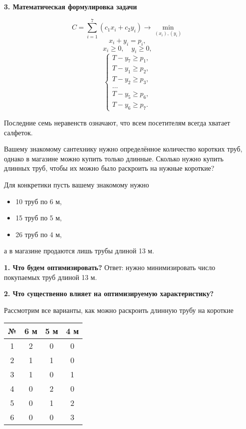 \textbf{3. Математическая формулировка задачи}

\[
	C = \sum_{i=1}^7 (c_1 x_i + c_2 y_i) \to \min_{(x_i), (y_i)}
\]
\[
	x_i + y_i = p_i,
\]
\[
	x_i \ge 0, \quad y_i \ge 0,
\]
\[
	\begin{cases}
		T - y_7 \ge p_1, \\
		T - y_1 \ge p_2, \\
		T - y_2 \ge p_3, \\
		\dots \\
		T - y_5 \ge p_6, \\
		T - y_6 \ge p_7.
	\end{cases}
\]

Последние семь неравенств означают, что всем посетителям всегда хватает салфеток.

\problem[раскроя]

Вашему знакомому сантехнику нужно определённое количество коротких труб, однако в магазине можно купить только длинные. Сколько нужно купить длинных труб, чтобы их можно было раскроить на нужные короткие?

Для конкретики пусть вашему знакомому нужно
\begin{itemize}[nosep]
	\item 10 труб по 6 м,
	
	\item 15 труб по 5 м,
	
	\item 26 труб по 4 м,
\end{itemize}

а в магазине продаются лишь трубы длиной 13 м.

\solution

\textbf{1. Что будем оптимизировать?} Ответ: нужно минимизировать число покупаемых труб длиной 13 м.

\textbf{2. Что существенно влияет на оптимизируемую характеристику?}

Рассмотрим все варианты, как можно раскроить длинную трубу на короткие

\begin{table}[h!]
	\centering
	\begin{tabular}{| c | c | c | c | } 
		\hline
		№ & 6 м & 5 м & 4 м \\ 
		\hline
		1 & 2 & 0 & 0 \\\hline
		2 & 1 & 1 & 0 \\\hline
		3 & 1 & 0 & 1 \\\hline
		4 & 0 & 2 & 0 \\\hline
		5 & 0 & 1 & 2 \\\hline
		6 & 0 & 0 & 3 \\\hline
	\end{tabular}
\end{table}

